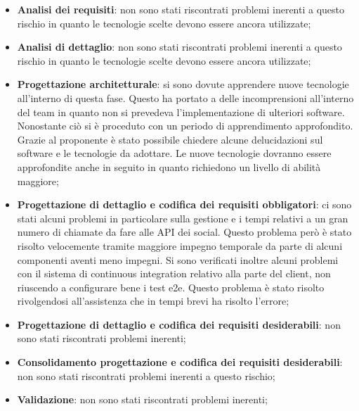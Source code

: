 			\begin{itemize}
				\item \textbf{Analisi dei requisiti}: non sono stati riscontrati problemi inerenti a questo rischio in quanto le tecnologie scelte devono essere ancora utilizzate;
				\item \textbf{Analisi di dettaglio}: non sono stati riscontrati problemi inerenti a questo rischio in quanto le tecnologie scelte devono essere ancora utilizzate;
				\item \textbf{Progettazione architetturale}: si sono dovute apprendere nuove tecnologie all'interno di questa fase. Questo ha portato a delle incomprensioni all'interno del team in quanto non si prevedeva l'implementazione di ulteriori software. Nonostante ciò si è proceduto con un periodo di apprendimento approfondito. Grazie al proponente è stato possibile chiedere alcune delucidazioni sul software e le tecnologie da adottare. Le nuove tecnologie dovranno essere approfondite anche in seguito in quanto richiedono un livello di abilità maggiore;
				\item \textbf{Progettazione di dettaglio e codifica dei requisiti obbligatori}: ci sono stati alcuni problemi in particolare sulla gestione e i tempi relativi a un gran numero di chiamate da fare alle API dei social. Questo problema però è stato risolto velocemente tramite maggiore impegno temporale da parte di alcuni componenti aventi meno impegni. Si sono verificati inoltre alcuni problemi con il sistema di continuous integration relativo alla parte del client, non riuscendo a configurare bene i test e2e. Questo problema è stato risolto rivolgendosi all'assistenza che in tempi brevi ha risolto l'errore;
				\item \textbf{Progettazione di dettaglio e codifica dei requisiti desiderabili}: non sono stati riscontrati problemi inerenti;
				\item \textbf{Consolidamento progettazione e codifica dei requisiti desiderabili}: non sono stati riscontrati problemi inerenti a questo rischio;
				\item \textbf{Validazione}: non sono stati riscontrati problemi inerenti;
			\end{itemize}


